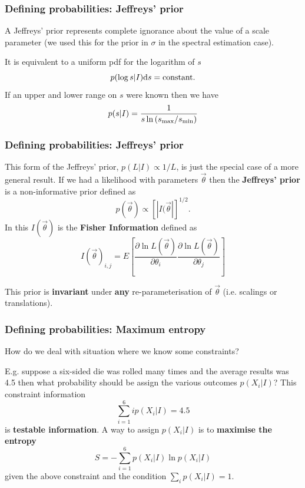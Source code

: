 \begin{frame}

\frametitle{Defining probabilities: Jeffreys' prior}
\label{definingprobabilities:jeffreysprior}

A Jeffreys' prior represents complete ignorance about the value of a scale parameter (we used this for the
prior in $\sigma$ in the spectral estimation case).

It is equivalent to a uniform pdf for the logarithm of $s$
\[
p(\log{s}|I) {\rm d}s = \text{constant}.
\]
If an upper and lower range on $s$ were known then we have
\[
p(s|I) = \frac{1}{s\ln{(s_{\rm max}/s_{\rm min})}}
\]

\end{frame}

\begin{frame}

\frametitle{Defining probabilities: Jeffreys' prior}
\label{definingprobabilities:jeffreysprior}

This form of the Jeffreys' prior, $p(L|I) \propto 1/L$, is just the special case of a more general result. If
we had a likelihood with parameters $\vec{\theta}$ then the \textbf{Jeffreys' prior} is a non-informative prior
defined as
\[
p(\vec{\theta}) \propto [|I(\vec{\theta}|]^{1/2}.
\]
In this $I(\vec{\theta})$ is the \textbf{Fisher Information} defined as
\[
I(\vec{\theta})_{i,j} = E\left[\frac{\partial \ln{L(\vec{\theta})}}{\partial \theta_i}
\frac{\partial \ln{L(\vec{\theta})}}{\partial \theta_j}\right]
\]

This prior is \textbf{invariant} under \textbf{any} re-parameterisation of $\vec{\theta}$ (i.e. scalings or
translations).

\end{frame}

\begin{frame}

\frametitle{Defining probabilities: Maximum entropy}
\label{definingprobabilities:maximumentropy}

How do we deal with situation where we know some constraints?

E.g. suppose a six-sided die was rolled many times and the average results was 4.5
then what probability should be assign the various outcomes $p(X_i|I)$? This constraint
information
\[
\sum_{i=1}^6 i p(X_i|I) = 4.5
\]
is \textbf{testable information}. A way to assign $p(X_i|I)$ is to \textbf{maximise the entropy}
\[
S = -\sum_{i=1}^6 p(X_i|I) \ln{p(X_i|I)}
\]
given the above constraint and the condition $\sum_i p(X_i|I) = 1$.

\end{frame}

